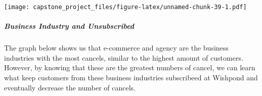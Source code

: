 \documentclass[]{article}
\newenvironment{Shaded}{\begin{snugshade}}{\end{snugshade}}
\newcommand{\KeywordTok}[1]{\textcolor[rgb]{0.13,0.29,0.53}{\textbf{#1}}}
\newcommand{\DataTypeTok}[1]{\textcolor[rgb]{0.13,0.29,0.53}{#1}}
\newcommand{\StringTok}[1]{\textcolor[rgb]{0.31,0.60,0.02}{#1}}
\newcommand{\OperatorTok}[1]{\textcolor[rgb]{0.81,0.36,0.00}{\textbf{#1}}}
\newcommand{\NormalTok}[1]{#1}
\let\oldsubparagraph\subparagraph
\renewcommand{\subparagraph}[1]{\oldsubparagraph{#1}\mbox{}}
\begin{document}
\begin{Shaded}
\end{Shaded}

\texttt{[image: capstone\_project\_files/figure-latex/unnamed-chunk-39-1.pdf]}

\subparagraph{Business Industry and
Unsubscribed}\label{business-industry-and-unsubscribed}

The graph below shows us that e-commerce and agency are the business
industries with the most cancels, similar to the highest amount of
customers. However, by knowing that these are the greatest numbers of
cancel, we can learn what keep customers from these business industries
subscribeed at Wishpond and eventually decrease the number of cancels.
\end{document}
